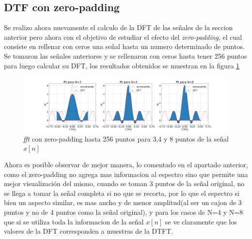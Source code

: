 \documentclass[letterpaper]{article}
\begin{document}
    \subsection*{DTF con zero-padding}
Se realizo ahora nuevamente el calculo de la DFT de las señales de la seccion anterior pero ahora con el objetivo de estudiar el efecto del \textit{zero-padding}, el cual consiste en rellenar con ceros una señal hasta un numero determinado de puntos. Se tomaron las señales anteriores y se rellenaron con ceros hasta tener 256 puntos para luego calcular su DFT, los resultados obtenidos se muestran en la figura \ref{fig.1c}
\begin{figure}[htb]
\centering
\includegraphics[width=\textwidth]{Img/punto_3_c.png}
\caption{\textit{fft} con zero-padding hasta 256 puntos para 3,4 y 8 puntos de la señal $x[n]$}
\label{fig.1c}
\end{figure}
Ahora es posible observar de mejor manera, lo comentado en el apartado anterior, como el zero-padding no agrega mas informacion al espectro sino que permite una mejor visualización del mismo, cuando se toman 3 puntos de la señal original, no se llega a tomar la señal completa si no que se recorta, por lo que el espectro si bien un aspecto similar, es mas ancho y de menor amplitud(al ser un cajon de 3 puntos y no de 4 puntos como la señal original), y para los casos de N=4 y N=8 que si se utiliza toda la informacion de la señal $x[n]$ se ve claramente que los valores de la DFT corresponden a muestras de la DTFT.
\end{document}
